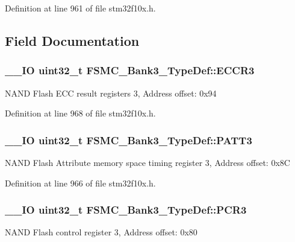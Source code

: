 Definition at line 961 of file stm32f10x.\-h.



\subsection{Field Documentation}
\hypertarget{struct_f_s_m_c___bank3___type_def_a6935beb5bbc2de668024c1989eecd46c}{
\subsubsection[{E\-C\-C\-R3}]{\setlength{\rightskip}{0pt plus 5cm}\-\_\-\-\_\-\-I\-O {\bf uint32\-\_\-t} F\-S\-M\-C\-\_\-\-Bank3\-\_\-\-Type\-Def\-::\-E\-C\-C\-R3}}\label{struct_f_s_m_c___bank3___type_def_a6935beb5bbc2de668024c1989eecd46c}
N\-A\-N\-D Flash E\-C\-C result registers 3, Address offset\-: 0x94 

Definition at line 968 of file stm32f10x.\-h.

\hypertarget{struct_f_s_m_c___bank3___type_def_a0cbf1b4647f98914238202828de47416}{
\subsubsection[{P\-A\-T\-T3}]{\setlength{\rightskip}{0pt plus 5cm}\-\_\-\-\_\-\-I\-O {\bf uint32\-\_\-t} F\-S\-M\-C\-\_\-\-Bank3\-\_\-\-Type\-Def\-::\-P\-A\-T\-T3}}\label{struct_f_s_m_c___bank3___type_def_a0cbf1b4647f98914238202828de47416}
N\-A\-N\-D Flash Attribute memory space timing register 3, Address offset\-: 0x8\-C 

Definition at line 966 of file stm32f10x.\-h.

\hypertarget{struct_f_s_m_c___bank3___type_def_a1f772e1028641cab7b923bf02115b919}{
\subsubsection[{P\-C\-R3}]{\setlength{\rightskip}{0pt plus 5cm}\-\_\-\-\_\-\-I\-O {\bf uint32\-\_\-t} F\-S\-M\-C\-\_\-\-Bank3\-\_\-\-Type\-Def\-::\-P\-C\-R3}}\label{struct_f_s_m_c___bank3___type_def_a1f772e1028641cab7b923bf02115b919}
N\-A\-N\-D Flash control register 3, Address offset\-: 0x80 

